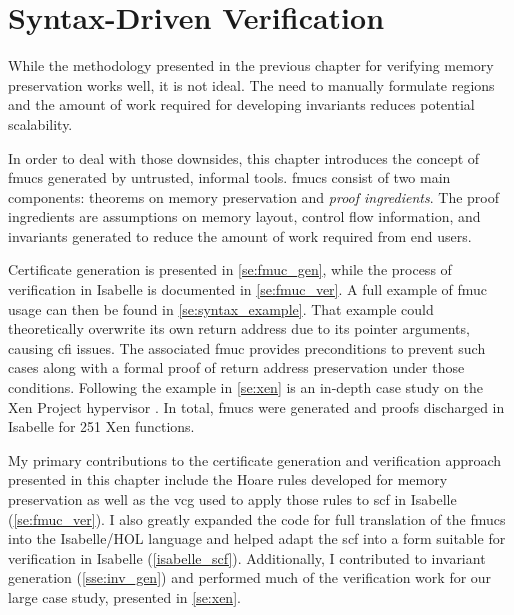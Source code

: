 \chapter{Syntax-Driven Verification}\label{ch:syntax}
While the methodology presented in the previous chapter
for verifying memory preservation works well, it is not ideal.
The need to manually formulate regions
and the amount of work required for developing invariants
reduces potential scalability.

In order to deal with those downsides,
this chapter introduces the concept of \acfp{fmuc}
generated by untrusted, informal tools.
\Acp{fmuc} consist of two main components:
theorems on memory preservation and \emph{proof ingredients}.%
The proof ingredients are assumptions on memory layout,
control flow information, and invariants
generated to reduce the amount of work required from end users.

Certificate generation is presented in \cref{se:fmuc_gen},
while the process of verification in Isabelle is documented in \cref{se:fmuc_ver}.
A full example of \ac{fmuc} usage can then be found in \cref{se:syntax_example}.
That example could theoretically overwrite
its own return address due to its pointer arguments, causing \ac{cfi} issues.
The associated \ac{fmuc} provides preconditions to prevent such cases
along with a formal proof of return address preservation under those conditions.
Following the example in \cref{se:xen} is an in-depth case study
on the Xen Project hypervisor \autocite{chisnall2008definitive}.
In total, \acp{fmuc} were generated and proofs discharged in Isabelle
for 251 Xen functions.

My primary contributions to the certificate generation and verification approach%
presented in this chapter include the Hoare rules developed
for memory preservation as well as the \ac{vcg} used to apply those rules
to \ac{scf} in Isabelle (\cref{se:fmuc_ver}).
I also greatly expanded the code for full translation of the \acp{fmuc}
into the Isabelle/HOL language
and helped adapt the \ac{scf} into a form suitable for verification
in Isabelle (\cref{isabelle_scf}).
Additionally, I contributed to invariant generation (\cref{sse:inv_gen})
and performed much of the verification work for our large case study,
presented in \cref{se:xen}.


